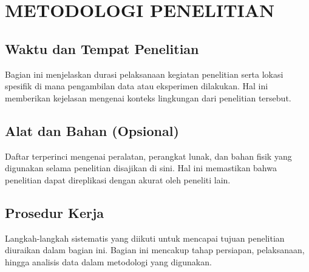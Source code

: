 \chapter{METODOLOGI PENELITIAN}

\section{Waktu dan Tempat Penelitian}
Bagian ini menjelaskan durasi pelaksanaan kegiatan penelitian serta lokasi spesifik di mana pengambilan data atau eksperimen dilakukan. Hal ini memberikan kejelasan mengenai konteks lingkungan dari penelitian tersebut.

\section{Alat dan Bahan (Opsional)}
Daftar terperinci mengenai peralatan, perangkat lunak, dan bahan fisik yang digunakan selama penelitian disajikan di sini. Hal ini memastikan bahwa penelitian dapat direplikasi dengan akurat oleh peneliti lain.

\section{Prosedur Kerja}
Langkah-langkah sistematis yang diikuti untuk mencapai tujuan penelitian diuraikan dalam bagian ini. Bagian ini mencakup tahap persiapan, pelaksanaan, hingga analisis data dalam metodologi yang digunakan.
